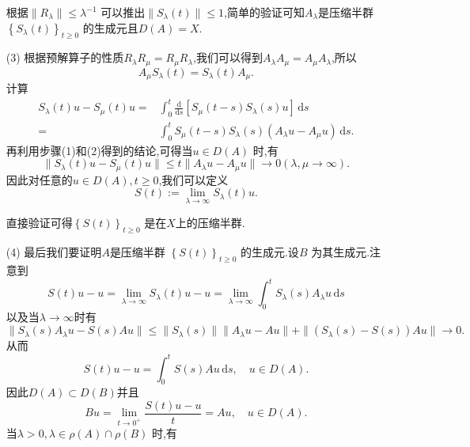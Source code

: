 \begin{frame}[t]
  \begin{enumerate}
    \item []  根据$\|R_\lambda\|\le \lambda^{-1}$ 可以推出$\|S_\lambda (t)\|\le 1$,简单的验证可知$A_\lambda$是压缩半群$\left\{S_\lambda(t)\right\} _{t\ge 0}$ 的生成元且$D(A)=X$.
  \item [(3)] 根据预解算子的性质$R_\lambda R_\mu =R_\mu R_\lambda$,我们可以得到$A_\lambda A_\mu = A_\mu A_\lambda$,所以
    \[
      A_\mu S_\lambda(t)=S_\lambda (t)A_\mu.
    \] 
    计算
    \begin{equation}
      \begin{aligned}
	S_\lambda(t)u-S_\mu(t)u=& \int_0^{t}\frac{\mathrm{d}}{\mathrm{d}s}[S_\mu(t-s)S_\lambda(s)u]\,\mathrm{d}s\\
	=& \int_0^{t}S_\mu(t-s)S_\lambda(s)(A_\lambda u-A_\mu u)\,\mathrm{d}s
      .\end{aligned}
    \end{equation}
    再利用步骤(1)和(2)得到的结论,可得当$u \in D(A)$ 时,有
  \[
    \|S_\lambda(t)u-S_\mu(t)u\|\le t \|A_\lambda u-A_\mu u\|\to 0 \left(\lambda,\mu\to \infty  \right) .
  \] 
  因此对任意的$u\in D(A),t\ge 0$,我们可以定义
  \begin{equation}
    S(t):=\lim_{\lambda\to \infty}S_\lambda(t)u.
  \end{equation}
  \end{enumerate}
\end{frame}

\begin{frame}[t]
\begin{enumerate}
  \item [] 直接验证可得$\left\{S(t)\right\} _{t\ge 0}$ 是在$X$上的压缩半群.
  \item[(4)] 最后我们要证明$A$是压缩半群 $\left\{S(t)\right\} _{t\ge 0}$ 的生成元.设$B$ 为其生成元.注意到
    \begin{equation}
      S(t)u-u=\lim_{\lambda\to \infty} S_\lambda(t)u-u=\lim_{\lambda\to \infty}\int_0^{t}S_\lambda(s)A_\lambda u\,\mathrm{d}s
    \end{equation}
    以及当$\lambda\to \infty$时有
    \[
      \|S_\lambda(s)A_\lambda u-S(s)A u\|\le \|S_\lambda(s)\|\|A_\lambda u -Au\|+\|(S_\lambda(s)-S(s))Au\|\to 0.
    \]
    从而
    \[
      S(t)u-u=\int_0^{t}S(s)Au\,\mathrm{d}s,\quad u\in D(A).
    \] 
    因此$D(A)\subset D(B)$并且
    \[
      Bu=\lim_{t\to 0^{+}}\frac{S(t)u-u}{t}=Au,\quad u\in D(A).
    \]
    当$\lambda>0,\lambda\in \rho(A)\cap \rho(B)$ 时,有
\end{enumerate}
\end{frame}

